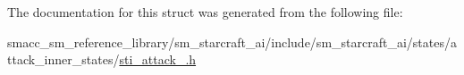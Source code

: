The documentation for this struct was generated from the following file\+:\begin{DoxyCompactItemize}
\item 
smacc\+\_\+sm\+\_\+reference\+\_\+library/sm\+\_\+starcraft\+\_\+ai/include/sm\+\_\+starcraft\+\_\+ai/states/attack\+\_\+inner\+\_\+states/\hyperlink{sti__attack__3_8h}{sti\+\_\+attack\+\_.\+h}\end{DoxyCompactItemize}
